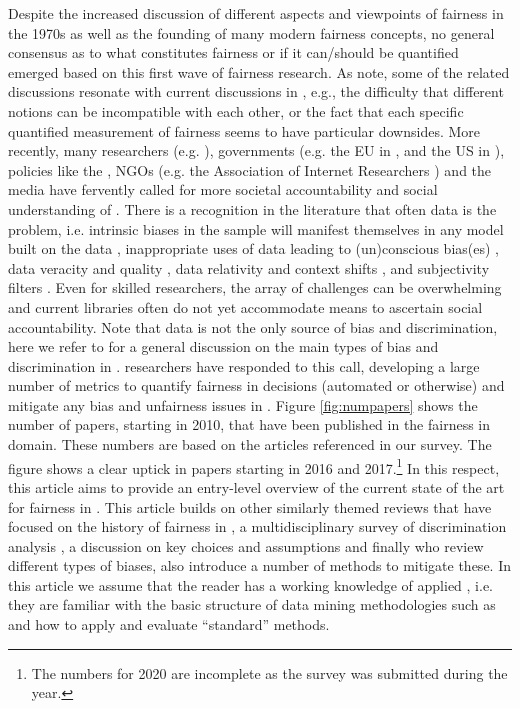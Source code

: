 Despite the increased discussion of different aspects and viewpoints of fairness in the 1970s as well as the founding of many modern fairness concepts, no general consensus as to what constitutes fairness or if it can/should be quantified emerged based on this first wave of fairness research. As  note, some of the related discussions resonate with current discussions in \ml, e.g., the difficulty that different notions can be incompatible with each other, or the fact that each specific quantified measurement of fairness seems to have particular downsides. 
More recently, many researchers (e.g. ), governments (e.g. the EU in , and the US in ), policies like the \gdpr, NGOs (e.g. the Association of Internet Researchers ) and the media have fervently called for more societal accountability and social understanding of \ml . There is a recognition in the literature that often data is the problem, i.e. intrinsic biases in the sample will manifest themselves in any model built on the data , inappropriate uses of data leading to (un)conscious bias(es) , data veracity and quality , data relativity and context shifts , and subjectivity filters . Even for skilled \ml researchers, the array of challenges can be overwhelming and current \ml libraries often do not yet accommodate means to ascertain social accountability. Note that data is not the only source of bias and discrimination, here we refer to  for a general discussion on the main types of bias and discrimination in \ml . 
\ml researchers have responded to this call, developing a large number of metrics to quantify fairness in decisions (automated or otherwise) and mitigate any bias and unfairness issues in \ml . Figure \ref{fig:numpapers} shows the number of papers, starting in 2010, that have been published in the fairness in \ml domain. 
These numbers are based on the articles referenced in our survey. The figure shows a clear uptick in papers starting in 2016 and 2017.\footnote{The numbers for 2020 are incomplete as the survey was submitted during the year.} 
In this respect, this article aims to provide an entry-level overview of the current state of the art for fairness in \ml . This article builds on other similarly themed reviews that have focused on the history of fairness in \ml , a multidisciplinary survey of discrimination analysis , a discussion on key choices and assumptions  and finally  who review different types of biases,  also introduce a number of methods to mitigate these. In this article we assume that the reader has a working knowledge of applied \ml , i.e. they are familiar with the basic structure of data mining methodologies such as  and how to apply and evaluate ``standard'' \ml methods. 
